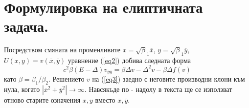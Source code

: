 \documentclass{article}
\newcommand{\rf}[1]{(\ref{#1})}
\begin{document}
\section{Формулировка на елиптичната задача.}

Посредством смяната на променливите $x=\sqrt\beta_1 { \overline x}$, $y=\sqrt\beta_1 { \overline y}$, $U(x,y)= v({ \overline x},{ \overline y} )$ уравнение 
\rf{eq2} добива следната форма
 \begin{equation}\label{eq3}
c^2 \beta (E- \Delta) v_{{\overline y}{\overline y}} = \beta \Delta v - \Delta^2 v - \beta \Delta f(v)
\end{equation}
като $\beta = \beta_1 / \beta_2$.
Решението $v$ на \rf{eq3} заедно с неговите производни клони към нула, когато $|{\overline x}^2 +{\overline y}^2|\rightarrow \infty$.
Навсякъде по - надолу в текста ще се използват отново старите означения $x,y$ вместо ${\overline x},{\overline y}$.
\end{document}
